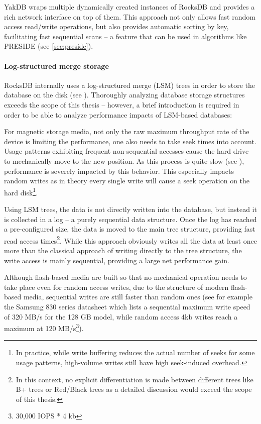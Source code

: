 \documentclass[a4paper, 12pt, twoside, reqn]{report}
\numberwithin{figure}{chapter}
\newtheorem[L]{boxedDefinition}{Definition}
\newtheorem[L]{boxedExample}{Example}
\begin{document}
YakDB wraps multiple dynamically created instances of RocksDB and provides a rich network interface on top of them. This approach not only allows fast random access read/write operations, but also provides automatic sorting by key, facilitating fast sequential scans -- a feature that can be used in algorithms like PRESIDE (see \ref{sec:preside}).

\paragraph{Log-structured merge storage} RocksDB internally uses a log-structured merge (LSM) trees in order to store the database on the disk (see \cite{o1996log}). Thoroughly analyzing database storage structures exceeds the scope of this thesis -- however, a brief introduction is required in order to be able to analyze performance impacts of LSM-based databases:

For magnetic storage media, not only the raw maximum throughput rate of the device is limiting the performance, one also needs to take seek times into account. Usage patterns exhibiting frequent non-sequential accesses cause the hard drive to mechanically move to the new position. As this process is quite slow (see \cite{ousterhout1989beating}), performance is severely impacted by this behavior. This especially impacts random writes as in theory every single write will cause a seek operation on the hard disk\footnote{In practice, while write buffering reduces the actual number of seeks for some usage patterns, high-volume writes still have high seek-induced overhead.}.

Using LSM trees, the data is not directly written into the database, but instead it is collected in a log -- a purely sequential data structure. Once the log has reached a pre-configured size, the data is moved to the main tree structure, providing fast read access times\footnote{In this context, no explicit differentiation is made between different trees like B+ trees or Red/Black trees as a detailed discussion would exceed the scope of this thesis.}. While this approach obviously writes all the data at least once more than the classical approach of writing directly to the tree structure, the write access is mainly sequential, providing a large net performance gain.

Although flash-based media are built so that no mechanical operation needs to take place even for random access writes, due to the structure of modern flash-based media, sequential writes are still faster than random ones (see for example the Samsung 830 series datasheet \cite{samsung830ds} which lists a sequential maximum write speed of 320 MB/s for the 128 GB model, while random access 4kb writes reach a maximum at 120 MB/s\footnote{30,000 IOPS * 4 kb}).
\end{document}
